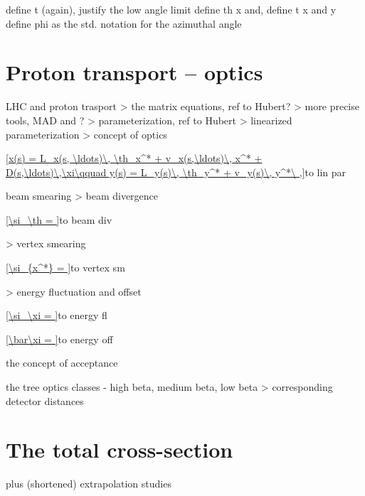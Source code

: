 \> define t (again), justify the low angle limit
\> define th x and, define t x and y
\> define phi as the std. notation for the azimuthal angle


\section[pr transport]{Proton transport -- optics}

\> LHC and proton trasport
\>> the matrix equations, ref to Hubert?
\>> more precise tools, MAD and ?
\>> parameterization, ref to Hubert
\>> linearized parameterization
\>> concept of optics

\eqref{x(s) = L_x(s, \ldots)\, \th_x^* + v_x(s,\ldots)\, x^* + D(s,\ldots)\,\xi\qquad y(s) = L_y(s)\, \th_y^* + v_y(s)\, y^*\ ,}{to lin par}

\> beam smearing
\>> beam divergence

\eqref{\si_\th = }{to beam div}

\>> vertex smearing

\eqref{\si_{x^*} = }{to vertex sm}

\>> energy fluctuation and offset

\eqref{\si_\xi = }{to energy fl}

\eqref{\bar\xi = }{to energy off}

\> the concept of acceptance

\> the tree optics classes - high beta, medium beta, low beta
\>> corresponding detector distances

\section{The total cross-section}

\> plus (shortened) extrapolation studies

%
